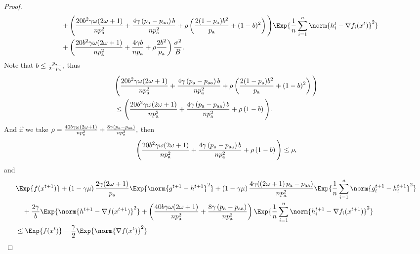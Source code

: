 \documentclass{article}
\newcommand*{\probavailable}{\ensuremath{p_{\textnormal{a}}}}
\newcommand*{\probpairaa}{\ensuremath{p_{\textnormal{aa}}}}
\begin{document}
\begin{proof}
\begin{align*}
        &\quad + \Bigg(\frac{20 b^2 \gamma \omega (2 \omega + 1)}{n \probavailable^2} + \frac{4 \gamma \left(\probavailable - \probpairaa\right) b}{n \probavailable^2} + \rho \left(\frac{2 (1 - \probavailable) b^2}{\probavailable} + (1 - b)^2\right)\Bigg)\Exp{\frac{1}{n}\sum_{i=1}^n\norm{h^{t}_i - \nabla f_i(x^{t})}^2} \\
        &\quad + \left(\frac{20 b^2 \gamma \omega (2 \omega + 1)}{n \probavailable^2} + \frac{4 \gamma b}{n \probavailable} + \rho \frac{2 b^2}{\probavailable}\right) \frac{\sigma^2}{B}.
      \end{align*}
      Note that $b \leq \frac{\probavailable}{2 - \probavailable},$ thus
      \begin{align*}
        &\Bigg(\frac{20 b^2 \gamma \omega (2 \omega + 1)}{n \probavailable^2} + \frac{4 \gamma \left(\probavailable - \probpairaa\right) b}{n \probavailable^2} + \rho \left(\frac{2 (1 - \probavailable) b^2}{\probavailable} + (1 - b)^2\right)\Bigg) \\
        &\leq \Bigg(\frac{20 b^2 \gamma \omega (2 \omega + 1)}{n \probavailable^2} + \frac{4 \gamma \left(\probavailable - \probpairaa\right) b}{n \probavailable^2} + \rho \left(1 - b\right)\Bigg).
      \end{align*}
      And if we take $\rho = \frac{40 b \gamma \omega (2 \omega + 1)}{n \probavailable^2} + \frac{8 \gamma \left(\probavailable - \probpairaa\right)}{n \probavailable^2},$ then
      \begin{align*}
        \Bigg(\frac{20 b^2 \gamma \omega (2 \omega + 1)}{n \probavailable^2} + \frac{4 \gamma \left(\probavailable - \probpairaa\right) b}{n \probavailable^2} + \rho \left(1 - b\right)\Bigg) \leq \rho,
      \end{align*}
      and 
      \begin{align*}
        &\Exp{f(x^{t + 1})} + \left(1 - \gamma \mu\right)\frac{2\gamma (2 \omega + 1)}{\probavailable} \Exp{\norm{g^{t+1} - h^{t+1}}^2} + \left(1 - \gamma \mu\right)\frac{4\gamma (\left(2 \omega + 1\right)\probavailable - \probpairaa)}{n \probavailable^2} \Exp{\frac{1}{n}\sum_{i=1}^n\norm{g^{t+1}_i - h^{t+1}_i}^2}\\
        &\quad  + \frac{2\gamma}{b} \Exp{\norm{h^{t+1} - \nabla f(x^{t+1})}^2} + \left(\frac{40 b \gamma \omega (2 \omega + 1)}{n \probavailable^2} + \frac{8 \gamma \left(\probavailable - \probpairaa\right)}{n \probavailable^2}\right) \Exp{\frac{1}{n}\sum_{i=1}^n\norm{h^{t+1}_i - \nabla f_i(x^{t+1})}^2}\\
        &\leq \Exp{f(x^t)} - \frac{\gamma}{2}\Exp{\norm{\nabla f(x^t)}^2} \\

\end{align*}
\end{proof}
\end{document}
